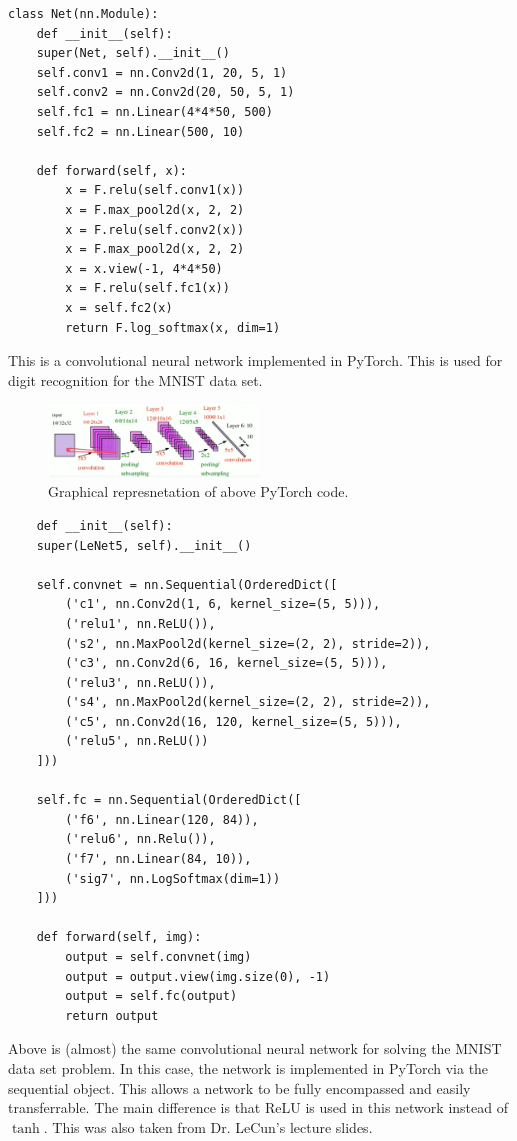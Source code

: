 \begin{verbatim}
class Net(nn.Module):
    def __init__(self):
    super(Net, self).__init__()
    self.conv1 = nn.Conv2d(1, 20, 5, 1)
    self.conv2 = nn.Conv2d(20, 50, 5, 1)
    self.fc1 = nn.Linear(4*4*50, 500)
    self.fc2 = nn.Linear(500, 10)
    
    def forward(self, x):
        x = F.relu(self.conv1(x))
        x = F.max_pool2d(x, 2, 2)
        x = F.relu(self.conv2(x))
        x = F.max_pool2d(x, 2, 2)
        x = x.view(-1, 4*4*50)
        x = F.relu(self.fc1(x))
        x = self.fc2(x)
        return F.log_softmax(x, dim=1)
\end{verbatim}

This is a convolutional neural network implemented in PyTorch. This is used for digit recognition for the MNIST data set.

\begin{figure}[ht]
  \centering
      \includegraphics[width=0.5\textwidth]{figs/PyTorchCNN.png}
          \caption{Graphical represnetation of above PyTorch code.}
\end{figure}

\begin{verbatim}
    def __init__(self):
    super(LeNet5, self).__init__()
    
    self.convnet = nn.Sequential(OrderedDict([
        ('c1', nn.Conv2d(1, 6, kernel_size=(5, 5))), 
        ('relu1', nn.ReLU()), 
        ('s2', nn.MaxPool2d(kernel_size=(2, 2), stride=2)),
        ('c3', nn.Conv2d(6, 16, kernel_size=(5, 5))),
        ('relu3', nn.ReLU()),
        ('s4', nn.MaxPool2d(kernel_size=(2, 2), stride=2)),
        ('c5', nn.Conv2d(16, 120, kernel_size=(5, 5))),
        ('relu5', nn.ReLU())
    ]))
    
    self.fc = nn.Sequential(OrderedDict([
        ('f6', nn.Linear(120, 84)), 
        ('relu6', nn.Relu()),
        ('f7', nn.Linear(84, 10)),
        ('sig7', nn.LogSoftmax(dim=1))
    ]))
    
    def forward(self, img):
        output = self.convnet(img)
        output = output.view(img.size(0), -1)
        output = self.fc(output)
        return output
\end{verbatim}

Above is (almost) the same convolutional neural network for solving the MNIST data set problem. In this case, the network is implemented in PyTorch via the sequential object. This allows a network to be fully encompassed and easily transferrable. The main difference is that ReLU is used in this network instead of $\tanh$. This was also taken from Dr. LeCun's lecture slides. 


